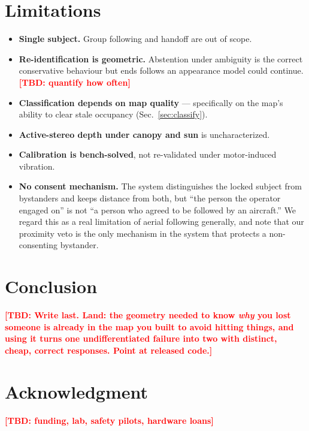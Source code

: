 \documentclass[conference]{IEEEtran}
\newcommand{\tbd}[1]{\textcolor{red}{\textbf{[TBD: #1]}}}
\begin{document}
\section{Limitations}
\label{sec:limitations}
\begin{itemize}
  \item \textbf{Single subject.} Group following and handoff are out of scope.
  \item \textbf{Re-identification is geometric.} Abstention under ambiguity is
        the correct conservative behaviour but ends follows an appearance model
        could continue. \tbd{quantify how often}
  \item \textbf{Classification depends on map quality} --- specifically on the
        map's ability to clear stale occupancy (Sec.~\ref{sec:classify}).
  \item \textbf{Active-stereo depth under canopy and sun} is uncharacterized.
  \item \textbf{Calibration is bench-solved}, not re-validated under
        motor-induced vibration.
  \item \textbf{No consent mechanism.} The system distinguishes the locked
        subject from bystanders and keeps distance from both, but ``the person
        the operator engaged on'' is not ``a person who agreed to be followed by
        an aircraft.'' We regard this as a real limitation of aerial following
        generally, and note that our proximity veto is the only mechanism in the
        system that protects a non-consenting bystander.
\end{itemize}

\section{Conclusion}
\label{sec:conclusion}
\tbd{Write last. Land: the geometry needed to know \emph{why} you lost someone is
already in the map you built to avoid hitting things, and using it turns one
undifferentiated failure into two with distinct, cheap, correct responses. Point
at released code.}

\section*{Acknowledgment}
\tbd{funding, lab, safety pilots, hardware loans}



\end{document}
